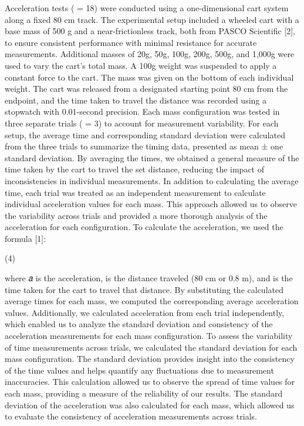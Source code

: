 Acceleration tests ( = 18) were conducted using a one-dimensional cart system along a fixed 80 cm track. The experimental setup included a wheeled cart with a base mass of 500 g and a near-frictionless track, both from PASCO Scientific [2], to ensure consistent performance with minimal resistance for accurate measurements. Additional masses of 20g, 50g, 100g, 200g, 500g, and 1,000g were used to vary the cart’s total mass. A 100g weight was suspended to apply a constant force to the cart. The mass was given on the bottom of each individual weight. 
The cart was released from a designated starting point 80 cm from the endpoint, and the time taken to travel the distance was recorded using a stopwatch with 0.01-second precision. Each mass configuration was tested in three separate trials ( = 3)  to account for measurement variability. For each setup, the average time and corresponding standard deviation were calculated from the three trials to summarize the timing data, presented as mean ± one standard deviation.
By averaging the times, we obtained a general measure of the time taken by the cart to travel the set distance, reducing the impact of inconsistencies in individual measurements. In addition to calculating the average time, each trial was treated as an independent measurement to calculate individual acceleration values for each mass. This approach allowed us to observe the variability across trials and provided a more thorough analysis of the acceleration for each configuration.
To calculate the acceleration, we used the formula [1]:  


                             (4)


where 𝑎 is the acceleration,  is the distance traveled (80 cm or 0.8 m), and  is the time taken for the cart to travel that distance. By substituting the calculated average times for each mass, we computed the corresponding average acceleration values. Additionally, we calculated acceleration from each trial independently, which enabled us to analyze the standard deviation and consistency of the acceleration measurements for each mass configuration.
To assess the variability of time measurements across trials, we calculated the standard deviation for each mass configuration. The standard deviation provides insight into the consistency of the time values and helps quantify any fluctuations due to measurement inaccuracies. This calculation allowed us to observe the spread of time values for each mass, providing a measure of the reliability of our results. The standard deviation of the acceleration was also calculated for each mass, which allowed us to evaluate the consistency of acceleration measurements across trials.


